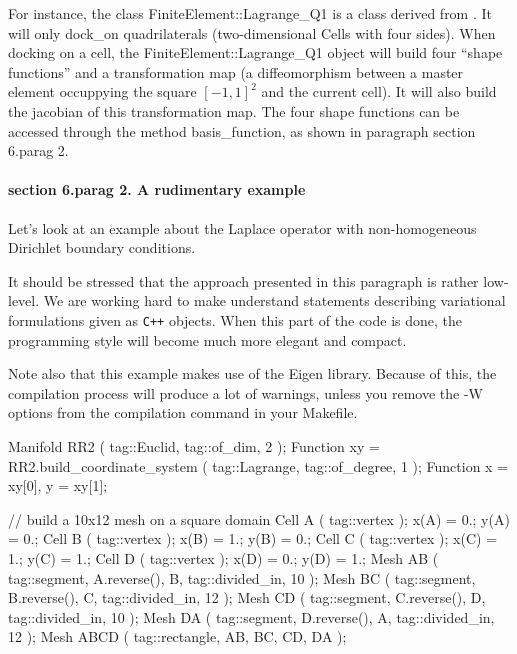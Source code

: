 For instance, the class {\codett FiniteElement::Lagrange\_Q1} is a class derived from
\hfil{}.
It will only {\codett dock\_on} quadrilaterals (two-dimensional {\codett Cell}s
with four sides).
When docking on a cell, the {\codett FiniteElement::Lagrange\_Q1} object will build four
``shape functions'' and a transformation map (a diffeomorphism between a master element
occuppying the square $ [-1, 1]^2 $ and the current cell).
It will also build the jacobian of this transformation map.
The four shape functions can be accessed through the method {\codett basis\_function},
as shown in paragraph \numb section 6.\numb parag 2.


\paragraph{\numb section 6.\numb parag 2. A rudimentary example}

Let's look at an example about the Laplace operator with non-homogeneous Dirichlet
boundary conditions.

It should be stressed that the approach presented in this paragraph is rather low-level.
We are working hard to make {\maniFEM} understand statements describing variational
formulations given as {\tt C++} objects.
When this part of the code is done, the programming style will become much more elegant
and compact.

Note also that this example makes use of the {\codett Eigen} library.
Because of this, the compilation process will produce a lot of warnings,
unless you remove the {\codett -W} options from the compilation command in your
{\codett Makefile}.

\verbatim
   Manifold RR2 ( tag::Euclid, tag::of_dim, 2 );
   Function xy = RR2.build_coordinate_system ( tag::Lagrange, tag::of_degree, 1 );
   Function x = xy[0],  y = xy[1];

   // build a 10x12 mesh on a square domain
   Cell A ( tag::vertex );  x(A) = 0.;   y(A) = 0.;
   Cell B ( tag::vertex );  x(B) = 1.;   y(B) = 0.;
   Cell C ( tag::vertex );  x(C) = 1.;   y(C) = 1.;
   Cell D ( tag::vertex );  x(D) = 0.;   y(D) = 1.;
   Mesh AB ( tag::segment, A.reverse(), B, tag::divided_in, 10 );
   Mesh BC ( tag::segment, B.reverse(), C, tag::divided_in, 12 );
   Mesh CD ( tag::segment, C.reverse(), D, tag::divided_in, 10 );
   Mesh DA ( tag::segment, D.reverse(), A, tag::divided_in, 12 );
   Mesh ABCD ( tag::rectangle, AB, BC, CD, DA );

